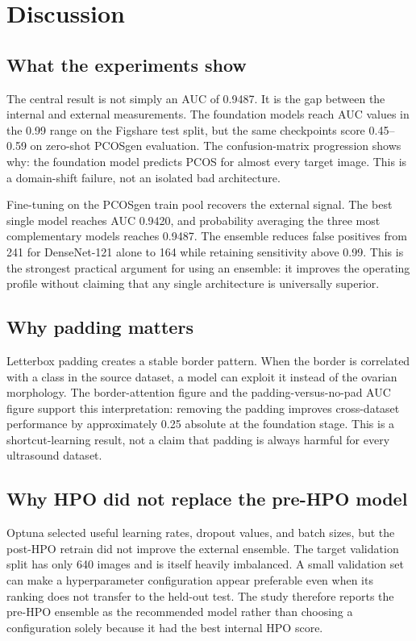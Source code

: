 \documentclass[../preamble.tex]{subfiles}
\begin{document}
\chapter{Discussion}
\label{ch:discussion}

\section{What the experiments show}
\label{sec:discussion-main}

The central result is not simply an AUC of 0.9487. It is the gap between the
internal and external measurements. The foundation models reach AUC values
in the 0.99 range on the Figshare test split, but the same checkpoints score
0.45--0.59 on zero-shot PCOSgen evaluation. The confusion-matrix progression
shows why: the foundation model predicts PCOS for almost every target image.
This is a domain-shift failure, not an isolated bad architecture.

Fine-tuning on the PCOSgen train pool recovers the external signal. The best
single model reaches AUC 0.9420, and probability averaging the three most
complementary models reaches 0.9487. The ensemble reduces false positives
from 241 for DenseNet-121 alone to 164 while retaining sensitivity above
0.99. This is the strongest practical argument for using an ensemble: it
improves the operating profile without claiming that any single architecture
is universally superior.

\section{Why padding matters}
\label{sec:discussion-padding}

Letterbox padding creates a stable border pattern. When the border is
correlated with a class in the source dataset, a model can exploit it instead
of the ovarian morphology. The border-attention figure and the
padding-versus-no-pad AUC figure support this interpretation: removing the
padding improves cross-dataset performance by approximately 0.25 absolute at
the foundation stage. This is a shortcut-learning result, not a claim that
padding is always harmful for every ultrasound dataset.

\section{Why HPO did not replace the pre-HPO model}
\label{sec:discussion-hpo}

Optuna selected useful learning rates, dropout values, and batch sizes, but
the post-HPO retrain did not improve the external ensemble. The target
validation split has only 640 images and is itself heavily imbalanced. A
small validation set can make a hyperparameter configuration appear
preferable even when its ranking does not transfer to the held-out test.
The study therefore reports the pre-HPO ensemble as the recommended model
rather than choosing a configuration solely because it had the best internal
HPO score.
\end{document}
